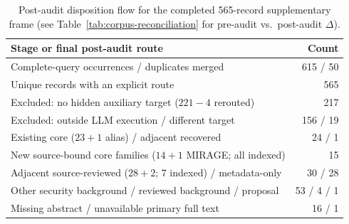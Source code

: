 \begin{table}[!ht]\centering\footnotesize
\caption{Post-audit disposition flow for the completed 565-record supplementary frame (see Table~\ref{tab:corpus-reconciliation} for pre-audit vs.\ post-audit $\Delta$).}\label{tab:finite-flow}
\begin{tabularx}{\columnwidth}{@{}Yr@{}}\toprule
Stage or final post-audit route & Count\\\midrule
Complete-query occurrences / duplicates merged & 615 / 50\\
Unique records with an explicit route & 565\\\midrule
Excluded: no hidden auxiliary target ($221-4$ rerouted) & 217\\
Excluded: outside LLM execution / different target & 156 / 19\\
Existing core ($23+1$ alias) / adjacent recovered & 24 / 1\\
New source-bound core families ($14+1$ MIRAGE; all indexed) & 15\\
Adjacent source-reviewed ($28+2$; 7 indexed) / metadata-only & 30 / 28\\
Other security background / reviewed background / proposal & 53 / 4 / 1\\
Missing abstract / unavailable primary full text & 16 / 1\\\bottomrule
\end{tabularx}\end{table}
